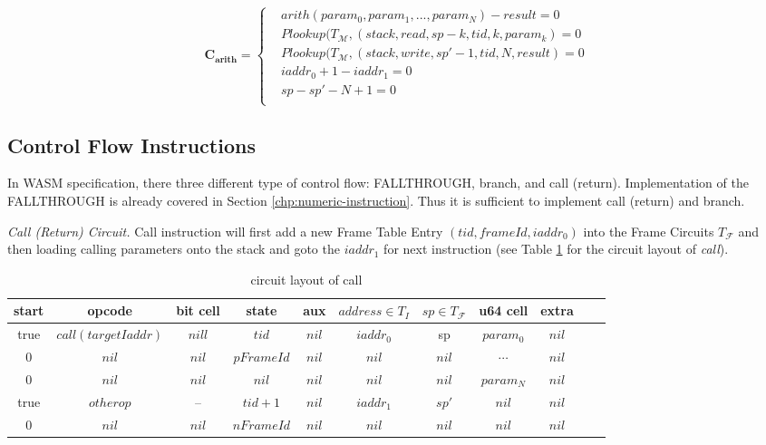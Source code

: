 \begin{equation}
    \mathbf{C_{arith}} = \begin{cases}
        &arith(param_0, param_1, ..., param_N) - result = 0 \\
        &Plookup(T_\mathcal{M}, (stack, read, sp - k, tid, k, param_k) = 0 \\
        &Plookup(T_\mathcal{M}, (stack, write, sp' - 1, tid, N, result) = 0 \\
        &iaddr_0 + 1 - iaddr_1 = 0\\
        &sp - sp' - N + 1 = 0\\
    \end{cases}
\label{eq:cs-arith}
\end{equation}
\subsection{Control Flow Instructions}
In WASM specification, there three different type of control flow: FALLTHROUGH, branch, and call (return). Implementation of the FALLTHROUGH is already covered in Section \ref{chp:numeric-instruction}. Thus it is sufficient to implement call (return) and branch.

\smallskip\noindent\emph{Call (Return) Circuit.}
Call instruction will first add a new Frame Table Entry $(tid, frameId, iaddr_0)$ into the Frame Circuits $T_\mathcal{F}$ and then loading calling parameters onto the stack and goto the $iaddr_1$ for next instruction (see Table \ref{tbl:call-instruction} for the circuit layout of \emph{call}).
\begin{table}[!h]
\begin{center}
\begin{tabular}{ | c | c | c | c | c | c | c | c | c | c | c | }
  \hline
  start & opcode & bit cell & state & aux & $address \in T_{I}$ & $sp \in T_\mathcal{F}$& u64 cell & extra \\ 
  \hline
   true & $call(targetIaddr)$ & $nill$ & $tid$ & $nil$ & $iaddr_0$ & sp & $param_0$ & $nil$\\ 
 \hline
   0 & $nil$ & $nil$ & $pFrameId$ & $nil$ & $nil$ & $nil$ & $\cdots$ & $nil$\\ 
 \hline
   0 & $nil$ & $nil$ & $nil$ & $nil$ & $nil$ & $nil$ & $param_N$ & $nil$\\ 
 \hline
   true & $otherop$ & -- & $tid + 1$ & $nil$ & $iaddr_1$ & $sp'$ & $nil$ & $nil$\\
 \hline
   0 & $nil$ & $nil$ & $nFrameId$ & $nil$ & $nil$ & $nil$ & $nil$ & $nil$\\ 
 \hline
\end{tabular}
\caption{circuit layout of call}
\label{tbl:call-instruction}
\end{center}
\end{table}

